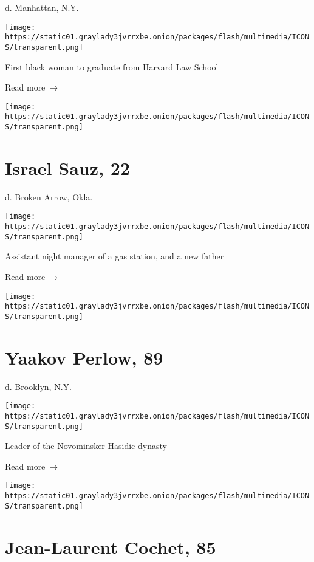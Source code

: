 d. Manhattan, N.Y.

\texttt{[image: https://static01.graylady3jvrrxbe.onion/packages/flash/multimedia/ICONS/transparent.png]}

First black woman to graduate from Harvard Law School

 Read more~→

\href{https://www.nytimes3xbfgragh.onion/2020/04/13/obituaries/israel-sauz-dead-coronavirus.html}{}

\texttt{[image: https://static01.graylady3jvrrxbe.onion/packages/flash/multimedia/ICONS/transparent.png]}

\hypertarget{israel-sauz-22}{%
\section{Israel Sauz, 22}\label{israel-sauz-22}}

d. Broken Arrow, Okla.

\texttt{[image: https://static01.graylady3jvrrxbe.onion/packages/flash/multimedia/ICONS/transparent.png]}

Assistant night manager of a gas station, and a new father

 Read more~→

\href{https://www.nytimes3xbfgragh.onion/2020/04/10/obituaries/rabbi-yaakov-perlow-dead.html}{}

\texttt{[image: https://static01.graylady3jvrrxbe.onion/packages/flash/multimedia/ICONS/transparent.png]}

\hypertarget{yaakov-perlow-89}{%
\section{Yaakov Perlow, 89}\label{yaakov-perlow-89}}

d. Brooklyn, N.Y.

\texttt{[image: https://static01.graylady3jvrrxbe.onion/packages/flash/multimedia/ICONS/transparent.png]}

Leader of the Novominsker Hasidic dynasty

 Read more~→

\href{https://www.nytimes3xbfgragh.onion/2020/04/10/obituaries/jean-laurent-cochet-dead-coronavirus.html}{}

\texttt{[image: https://static01.graylady3jvrrxbe.onion/packages/flash/multimedia/ICONS/transparent.png]}

\hypertarget{jean-laurent-cochet-85}{%
\section{Jean-Laurent Cochet, 85}\label{jean-laurent-cochet-85}}

